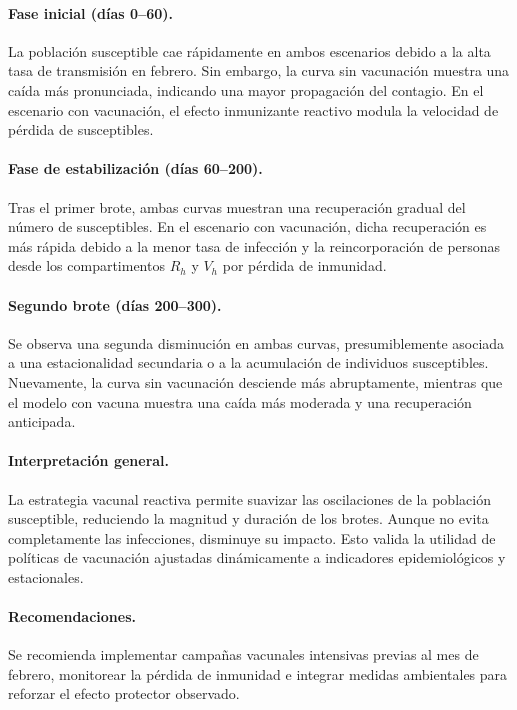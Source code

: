 \documentclass[12pt,a4paper]{article}
\begin{document}
\paragraph{Fase inicial (días 0--60).} La población susceptible cae rápidamente en ambos escenarios debido a la alta tasa de transmisión en febrero. Sin embargo, la curva sin vacunación muestra una caída más pronunciada, indicando una mayor propagación del contagio. En el escenario con vacunación, el efecto inmunizante reactivo modula la velocidad de pérdida de susceptibles.

\paragraph{Fase de estabilización (días 60--200).} Tras el primer brote, ambas curvas muestran una recuperación gradual del número de susceptibles. En el escenario con vacunación, dicha recuperación es más rápida debido a la menor tasa de infección y la reincorporación de personas desde los compartimentos $R_h$ y $V_h$ por pérdida de inmunidad.

\paragraph{Segundo brote (días 200--300).} Se observa una segunda disminución en ambas curvas, presumiblemente asociada a una estacionalidad secundaria o a la acumulación de individuos susceptibles. Nuevamente, la curva sin vacunación desciende más abruptamente, mientras que el modelo con vacuna muestra una caída más moderada y una recuperación anticipada.

\paragraph{Interpretación general.} La estrategia vacunal reactiva permite suavizar las oscilaciones de la población susceptible, reduciendo la magnitud y duración de los brotes. Aunque no evita completamente las infecciones, disminuye su impacto. Esto valida la utilidad de políticas de vacunación ajustadas dinámicamente a indicadores epidemiológicos y estacionales.

\paragraph{Recomendaciones.} Se recomienda implementar campañas vacunales intensivas previas al mes de febrero, monitorear la pérdida de inmunidad e integrar medidas ambientales para reforzar el efecto protector observado.
\end{document}
